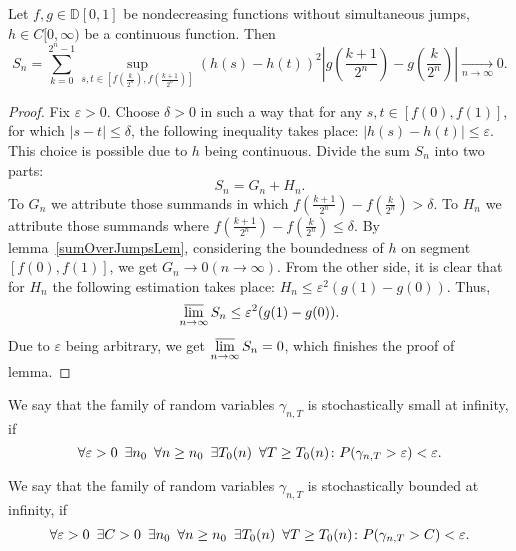\documentclass[12pt, a4paper, titlepage]{article}
\begin{document}
 \begin{lem}
 Let $f, g \in \mathbb{D}[0,1]$ be nondecreasing functions without 
 simultaneous jumps, $h\in C[0,\infty)$ be a continuous function. Then
 $$S_n=\sum\limits_{k=0}^{2^n-1}
 \sup\limits_{s,t \in [f(\frac{k}{2^n}), f(\frac{k+1}{2^n})]}(h(s)-h(t))^2
 \left|g\left(\frac{k+1}{2^n}\right)-g\left(\frac{k}{2^n}\right)\right|\xrightarrow[n\to\infty]{}0. 
 $$
 \end{lem}
 \begin{proof}
 Fix $\varepsilon>0$. Choose $\delta>0$ in such a way that for any $s,t \in [f(0), f(1)]$,
 for which $|s-t| \le \delta$, the following inequality takes place: $|h(s)-h(t)| \le \varepsilon$.
 This choice is possible due to $h$ being continuous. 
 Divide the sum $S_n$ into two parts:
 $$S_n=G_n+H_n.$$
 To $G_n$ we attribute those summands in which 
 $f(\frac{k+1}{2^n})-f(\frac{k}{2^n}) > \delta.$
 To $H_n$ we attribute those summands where 
 $f(\frac{k+1}{2^n})-f(\frac{k}{2^n}) \le \delta.$
 By lemma~\ref{sumOverJumpsLem}, considering the boundedness of $h$
 on segment $[f(0), f(1)]$, we get $G_n \to 0 (n \to \infty).$
 From the other side, it is clear that for $H_n$ the following estimation takes place: 
 $H_n \le \varepsilon^2(g(1)-g(0)).$
 Thus,
 $$\varlimsup\limits_{n\to \infty}S_n \le \varepsilon^2(g(1)-g(0)).$$
 Due to $\varepsilon$ being arbitrary, we get
 $\varlimsup\limits_{n\to \infty}S_n = 0$, which finishes the proof of lemma. 
 \end{proof}
 
  \begin{definition}
  We say that the family of random variables $\gamma_{n,T}$
 is stochastically small at infinity, if 
  $$\forall \varepsilon>0 \enskip \exists n_0 \enskip
    \forall n \ge n_0 \enskip \exists T_0(n)\enskip \forall T \ge T_0(n) \colon
    P(\gamma_{n, T}>\varepsilon)<\varepsilon.$$
 \end{definition}
 
   \begin{definition}
 We say that the family of random variables $\gamma_{n,T}$
 is stochastically bounded at infinity, if
  $$\forall \varepsilon>0 \enskip \exists C>0 \enskip \exists n_0 \enskip
    \forall n \ge n_0 \enskip \exists T_0(n)\enskip \forall T \ge T_0(n) \colon
    P(\gamma_{n, T}>C)<\varepsilon.$$
 \end{definition}
 
\end{document}
